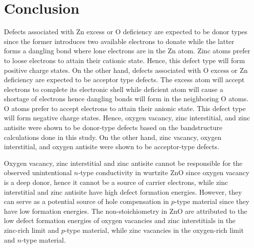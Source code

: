 \chapter{Conclusion} \label{chap:conclu}
Defects associated with Zn excess or O deficiency are expected to be donor types since the former introduces two available electrons to donate while the latter forms a dangling bond where lone electrons are in the Zn atom. Zinc atoms prefer to loose electrons to attain their cationic state. Hence, this defect type will form  positive charge states. On the other hand, defects associated with O excess or Zn deficiency are expected to be acceptor type defects. The excess  atom will accept electrons to complete its electronic shell while deficient  atom will cause a shortage of electrons hence  dangling bonds will form in the neighboring O atoms. O atoms prefer to accept electrons to attain their anionic state.
This defect type will form  negative charge states. Hence, oxygen vacancy, zinc interstitial, and zinc antisite were shown to be donor-type defects based on the bandstructure calculations done in this study. On the other hand, zinc vacancy, oxygen interstitial, and oxygen antisite were shown to be acceptor-type defects. 

Oxygen vacancy,  zinc interstitial and zinc antisite cannot be responsible for the observed unintentional $n$-type conductivity in wurtzite ZnO since oxygen vacancy is a deep donor, hence it cannot be a source of carrier electrons, while  zinc interstitial and zinc antisite have high defect formation energies. However, they can serve as a potential source of hole compensation in  $p$-type material since they have low formation energies. The non-stoichiometry in ZnO are attributed to the low defect formation energies of oxygen vacancies and  zinc interstitials in the zinc-rich limit and $p$-type material, while zinc vacancies in the oxygen-rich limit and $n$-type material. 




